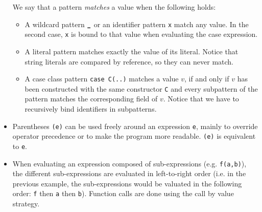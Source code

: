 \begin{itemize}
        We say that a pattern \emph{matches} a value when the following holds:
        \begin{itemize}
            \item A wildcard pattern $\text{\tt \textbf{\_}}$ or an identifier pattern
                \lstinline{x} match any value. In the second case,
                \lstinline{x} is bound to that value when evaluating
                the case expression.
            \item A literal pattern matches exactly the value of its literal.
                Notice that string literals are compared by reference,
                so they can never match.
            \item A case class pattern \lstinline{case C(..)} matches a value $v$,
                if and only if $v$ has been constructed with the same constructor \lstinline{C}
                and every subpattern of the pattern matches the corresponding field of $v$.
                Notice that we have to recursively bind identifiers in subpatterns.
        \end{itemize}

	\item Parentheses \lstinline{(e)} can be used freely around an expression \lstinline{e},
		mainly to override operator precedence or to make the program more readable.
		\lstinline{(e)} is equivalent to \lstinline{e}.

    \item When evaluating an expression composed of sub-expressions (e.g. \lstinline{f(a,b)}),
    the different sub-expressions are evaluated in left-to-right order (i.e. in the previous example, the sub-expressions would be valuated in the following order: \lstinline{f} then \lstinline{a} then \lstinline{b}).
    Function calls are done using the call by value strategy.
\end{itemize}

